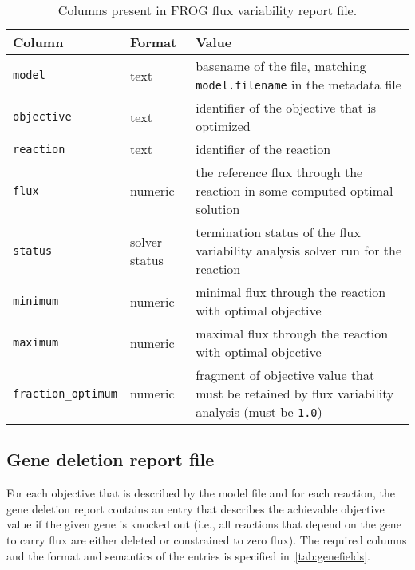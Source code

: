 

\begin{table}[p]\tablefont
\begin{tabular}{llp{30em}}
\toprule
Column & Format & Value \\
\midrule
\verb|model|
 & text
 & basename of the file, matching \verb|model.filename| in the metadata file
 \\
\verb|objective|
 & text
 & identifier of the objective that is optimized
 \\
\verb|reaction|
 & text
 & identifier of the reaction
 \\
\verb|flux|
 & numeric
 & the reference flux through the reaction in some computed optimal solution
 \\
\verb|status|
 & solver status
 & termination status of the flux variability analysis solver run for the reaction
 \\
\verb|minimum|
 & numeric
 & minimal flux through the reaction with optimal objective
 \\
\verb|maximum|
 & numeric
 & maximal flux through the reaction with optimal objective
 \\
\verb|fraction_optimum|
 & numeric
 & fragment of objective value that must be retained by flux variability analysis (must be \verb|1.0|)
 \\
\bottomrule
\end{tabular}
\caption{Columns present in FROG flux variability report file.}
\label{tab:fvafields}
\end{table}

\subsection{Gene deletion report file}
\label{sec:genes}

For each objective that is described by the model file and for each reaction, the gene deletion report contains an entry that describes the achievable objective value if the given gene is knocked out (i.e., all reactions that depend on the gene to carry flux are either deleted or constrained to zero flux). The required columns and the format and semantics of the entries is specified in~\cref{tab:genefields}.


